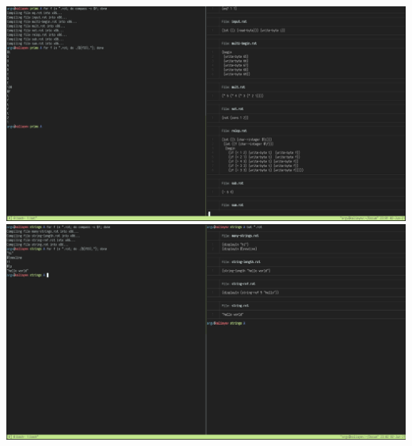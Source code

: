 \includegraphics[width=0.8\paperwidth]{figures/ch4/test-run-5}
\includegraphics[width=0.8\paperwidth]{figures/ch4/test-run-6}
